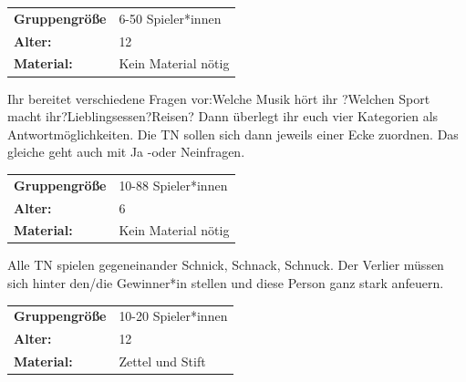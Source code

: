 \begin{tabularx}{\textwidth}{>{\bfseries}lX}
   Gruppengröße   & 6-50 Spieler*innen\\
    Alter: & 12 \\
    Material: & Kein Material nötig \\ \end{tabularx}
Ihr bereitet verschiedene Fragen vor:Welche Musik hört ihr ?Welchen Sport macht ihr?Lieblingsessen?Reisen? Dann überlegt ihr euch vier Kategorien als Antwortmöglichkeiten. Die TN sollen sich dann jeweils einer Ecke zuordnen. Das gleiche geht auch mit Ja -oder Neinfragen. \\




\begin{table}[H]
\begin{tabular}{>{\bfseries}lp{8cm}}
  Gruppengröße   & 10-88 Spieler*innen\\
    Alter: & 6 \\
    Material: & Kein Material nötig\\
\end{tabular}
\end{table} 
Alle TN spielen gegeneinander Schnick, Schnack, Schnuck. Der Verlier müssen sich hinter den/die Gewinner*in stellen und diese Person ganz stark anfeuern.  \\

\newpage
\begin{table}[H]
\begin{tabular}{>{\bfseries}lp{8cm}}
   Gruppengröße   & 10-20 Spieler*innen\\
    Alter: & 12 \\
    Material: &Zettel und Stift \\
\end{tabular}
\end{table} 

